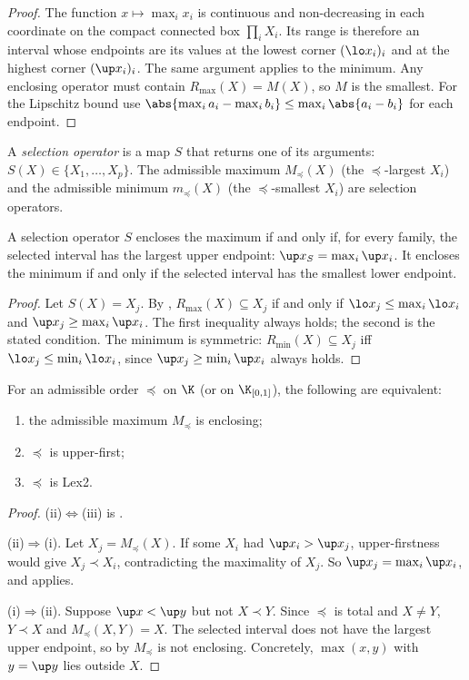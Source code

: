 \begin{proof}
The function $x\mapsto\max_ix_i$ is continuous and non-decreasing in each coordinate on the compact connected box $\prod_iX_i$. Its range is therefore an interval whose endpoints are its values at the lowest corner $(\lo x_i)_i$ and at the highest corner $(\up x_i)_i$. The same argument applies to the minimum. Any enclosing operator must contain $R_{\max}(X)=M(X)$, so $M$ is the smallest. For the Lipschitz bound use $\abs{\max_ia_i-\max_ib_i}\le\max_i\abs{a_i-b_i}$ for each endpoint.
\end{proof}

A \emph{selection operator} is a map $S$ that returns one of its arguments: $S(X)\in\{X_1,\dots,X_p\}$. The admissible maximum $M_\preceq(X)$ (the $\preceq$-largest $X_i$) and the admissible minimum $m_\preceq(X)$ (the $\preceq$-smallest $X_i$) are selection operators.

\begin{lemma}\label{lem:selection}
A selection operator $S$ encloses the maximum if and only if, for every family, the selected interval has the largest upper endpoint: $\up x_{S}=\max_i\up x_i$. It encloses the minimum if and only if the selected interval has the smallest lower endpoint.
\end{lemma}

\begin{proof}
Let $S(X)=X_j$. By , $R_{\max}(X)\subseteq X_j$ if and only if $\lo x_j\le\max_i\lo x_i$ and $\up x_j\ge\max_i\up x_i$. The first inequality always holds; the second is the stated condition. The minimum is symmetric: $R_{\min}(X)\subseteq X_j$ iff $\lo x_j\le\min_i\lo x_i$, since $\up x_j\ge\min_i\up x_i$ always holds.
\end{proof}

\begin{theorem}\label{thm:char}
For an admissible order $\preceq$ on $\K$ (or on $\K_{[0,1]}$), the following are equivalent:
\begin{enumerate}[label=(\roman*)]
\item the admissible maximum $M_\preceq$ is enclosing;
\item $\preceq$ is upper-first;
\item $\preceq$ is Lex2.
\end{enumerate}
\end{theorem}

\begin{proof}
(ii)$\Leftrightarrow$(iii) is .

(ii)$\Rightarrow$(i). Let $X_j=M_\preceq(X)$. If some $X_i$ had $\up x_i>\up x_j$, upper-firstness would give $X_j\prec X_i$, contradicting the maximality of $X_j$. So $\up x_j=\max_i\up x_i$, and  applies.

(i)$\Rightarrow$(ii). Suppose $\up x<\up y$ but not $X\prec Y$. Since $\preceq$ is total and $X\ne Y$, $Y\prec X$ and $M_\preceq(X,Y)=X$. The selected interval does not have the largest upper endpoint, so by  $M_\preceq$ is not enclosing. Concretely, $\max(x,y)$ with $y=\up y$ lies outside $X$.
\end{proof}

